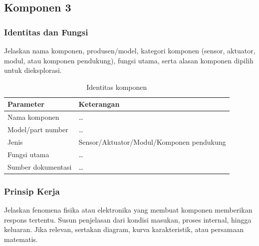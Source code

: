 
\subsection{Komponen 3}
\label{subsec:komponen-03}

\subsubsection{Identitas dan Fungsi}
Jelaskan nama komponen, produsen/model, kategori komponen (sensor, aktuator,
modul, atau komponen pendukung), fungsi utama, serta alasan komponen dipilih
untuk dieksplorasi.

\begin{table}[H]
\centering
\caption{Identitas komponen}
\begin{tabularx}{\textwidth}{@{}lX@{}}
\toprule
Parameter & Keterangan \\
\midrule
Nama komponen & \dots \\
Model/part number & \dots \\
Jenis & Sensor/Aktuator/Modul/Komponen pendukung \\
Fungsi utama & \dots \\
Sumber dokumentasi & \dots \\
\bottomrule
\end{tabularx}
\end{table}

\subsubsection{Prinsip Kerja}
Jelaskan fenomena fisika atau elektronika yang membuat komponen memberikan
respons tertentu. Susun penjelasan dari kondisi masukan, proses internal,
hingga keluaran. Jika relevan, sertakan diagram, kurva karakteristik, atau
persamaan matematis.


